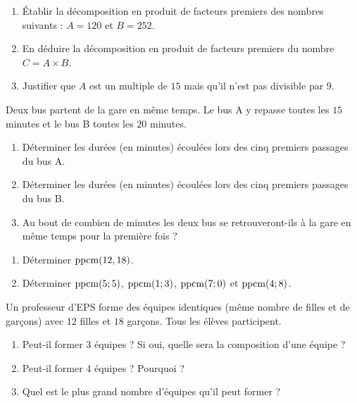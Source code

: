 \documentclass[10pt, a4paper]{article}
\begin{document}
\begin{Application}[][20 min]
\begin{enumerate}[leftmargin=*,itemsep=0.5pt]
    \item Établir la décomposition en produit de facteurs premiers des nombres suivants : $A = 120$ et $B = 252$.

    \item En déduire la décomposition en produit de facteurs premiers du nombre $C = A \times B$.

    \item Justifier que $A$ est un multiple de $15$ mais qu'il n'est pas divisible par $9$.
\end{enumerate}
\end{Application}



\begin{Activite}[][10 min]
Deux bus partent de la gare en même temps.
Le bus A y repasse toutes les $15$ minutes et le bus B toutes les $20$ minutes.

\begin{enumerate}[leftmargin=*,itemsep=0.5pt]
    \item Déterminer les durées (en minutes) écoulées lors des cinq premiers passages du bus A.
    \item Déterminer les durées (en minutes) écoulées lors des cinq premiers passages du bus B.
    \item Au bout de combien de minutes les deux bus se retrouveront-ils à la gare en même temps pour la première fois ?
\end{enumerate}
\end{Activite}

\begin{Application}[][10 min]
\begin{enumerate}[leftmargin=*,itemsep=0.5pt]
    \item Déterminer $\operatorname{ppcm}(12, 18)$.

    \item Déterminer $\operatorname{ppcm}(5;5)$, $\operatorname{ppcm}(1;3)$, $\operatorname{ppcm}(7;0)$ et $\operatorname{ppcm}(4;8)$.
\end{enumerate}
\end{Application}


\begin{Activite}[][10 min]
Un professeur d'EPS forme des équipes identiques (même nombre de filles et de garçons) avec $12$ filles et $18$ garçons. Tous les élèves participent.

\begin{enumerate}[leftmargin=*,itemsep=0.5pt]
    \item Peut-il former $3$ équipes ? Si oui, quelle sera la composition d'une équipe ?
    \item Peut-il former $4$ équipes ? Pourquoi ?
    \item Quel est le plus grand nombre d'équipes qu'il peut former ?
\end{enumerate}
\end{Activite}
\end{document}
